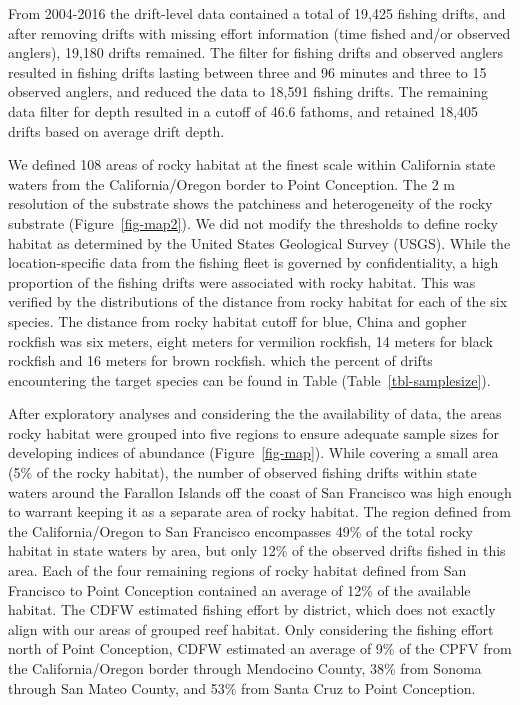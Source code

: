 \documentclass[
  12pt,
  authoryear,
  preprint,
  3p]{elsarticle}
\begin{document}
From 2004-2016 the drift-level data contained a total of 19,425 fishing
drifts, and after removing drifts with missing effort information (time
fished and/or observed anglers), 19,180 drifts remained. The filter for
fishing drifts and observed anglers resulted in fishing drifts lasting
between three and 96 minutes and three to 15 observed anglers, and
reduced the data to 18,591 fishing drifts. The remaining data filter for
depth resulted in a cutoff of 46.6 fathoms, and retained 18,405 drifts
based on average drift depth.

We defined 108 areas of rocky habitat at the finest scale within
California state waters from the California/Oregon border to Point
Conception. The 2 m resolution of the substrate shows the patchiness and
heterogeneity of the rocky substrate (Figure~\ref{fig-map2}). We did not
modify the thresholds to define rocky habitat as determined by the
United States Geological Survey (USGS). While the location-specific data
from the fishing fleet is governed by confidentiality, a high proportion
of the fishing drifts were associated with rocky habitat. This was
verified by the distributions of the distance from rocky habitat for
each of the six species. The distance from rocky habitat cutoff for
blue, China and gopher rockfish was six meters, eight meters for
vermilion rockfish, 14 meters for black rockfish and 16 meters for brown
rockfish. which the percent of drifts encountering the target species
can be found in Table (Table~\ref{tbl-samplesize}).

After exploratory analyses and considering the the availability of data,
the areas rocky habitat were grouped into five regions to ensure
adequate sample sizes for developing indices of abundance
(Figure~\ref{fig-map}). While covering a small area (5\% of the rocky
habitat), the number of observed fishing drifts within state waters
around the Farallon Islands off the coast of San Francisco was high
enough to warrant keeping it as a separate area of rocky habitat. The
region defined from the California/Oregon to San Francisco encompasses
49\% of the total rocky habitat in state waters by area, but only 12\%
of the observed drifts fished in this area. Each of the four remaining
regions of rocky habitat defined from San Francisco to Point Conception
contained an average of 12\% of the available habitat. The CDFW
estimated fishing effort by district, which does not exactly align with
our areas of grouped reef habitat. Only considering the fishing effort
north of Point Conception, CDFW estimated an average of 9\% of the CPFV
from the California/Oregon border through Mendocino County, 38\% from
Sonoma through San Mateo County, and 53\% from Santa Cruz to Point
Conception.
\end{document}
